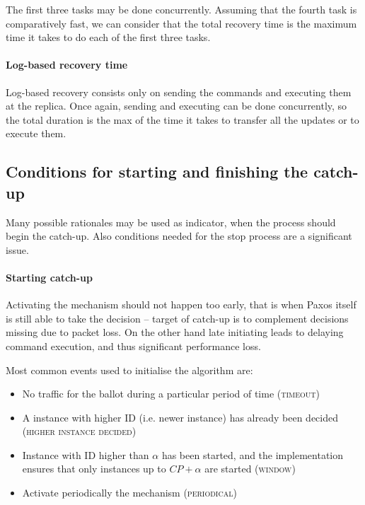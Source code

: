The first three tasks may be done concurrently. Assuming that the fourth task is comparatively fast, we can consider that the total recovery time is the maximum time it takes to do each of the first three tasks.

\paragraph{Log-based recovery time}

Log-based recovery consists only on sending the commands and executing them at the replica. Once again, sending and executing can be done concurrently, so the total duration is the max of the time it takes to transfer all the updates or to execute them.

\subsection{Conditions for starting and finishing the catch-up}
\label{subsec:Conditions_for_starting_and_finishing_the_catch-up}
Many possible rationales may be used as indicator, when the process should begin the catch-up. Also conditions needed for the stop process are a significant issue.

\paragraph*{Starting catch-up}
Activating the mechanism should not happen too early, that is when Paxos itself is still able to take the decision -- target of catch-up is to complement decisions missing due to packet loss. On the other hand late initiating leads to delaying command execution, and thus significant performance loss.

Most common events used to initialise the algorithm are:
\begin{itemize}
  \item No traffic for the ballot during a particular period of time (\textsc{timeout})
  \item A instance with higher ID (i.e. newer instance) has already been decided (\textsc{higher instance decided})
  \item Instance with ID higher than $\alpha$ has been started, and the implementation ensures that only instances up to $CP+\alpha$ are started (\textsc{window})
  \item Activate periodically the mechanism (\textsc{periodical})
\end{itemize}

